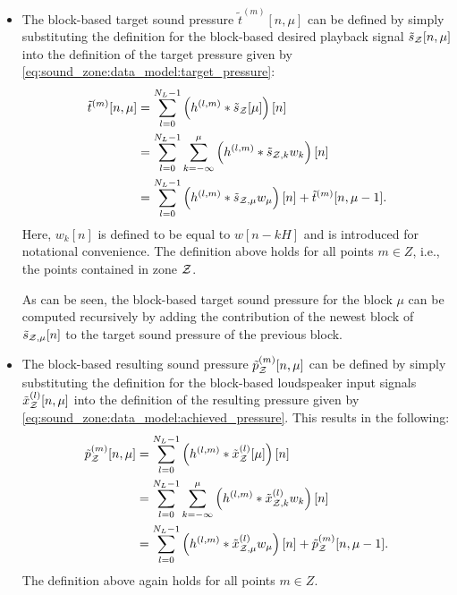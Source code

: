 \begin{itemize}
    \item 
        The block-based target sound pressure $\tilde{t}^{(m)}[n, \mu]$ can be defined by simply 
        substituting the definition for the block-based desired playback signal $\tilde{s}_{\mathcal{Z}}[n, \mu]$ into the definition of the 
        target pressure given by \autoref{eq:sound_zone:data_model:target_pressure}:
        \begin{equation}
            \begin{aligned}
                \tilde{t}^{(m)}[n, \mu] &= \sum_{l=0}^{N_L-1} \left(h^{(l,m)} \ast \tilde{s}_{\mathcal{Z}}[\mu]\right)[n]\\
                                        &= \sum_{l=0}^{N_L - 1}\sum_{k=-\infty}^{\mu}\left(h^{(l,m)}\ast\tilde{s}_{\mathcal{Z},k}w_k\right)[n] \\
                                   &= \sum_{l=0}^{N_L-1}\left(h^{(l,m)}\ast\tilde{s}_{\mathcal{Z},\mu}w_\mu\right)[n] + \tilde{t}^{(m)}[n, \mu - 1].  
            \end{aligned}
            \label{eq:perceptual_sound_zones:stft:block_based:target_pressure}
        \end{equation}
        Here, $w_k[n]$ is defined to be equal to $w[n - kH]$ and is introduced for notational convenience.  
        The definition above holds for all points $m\in Z$, i.e., the points contained in zone $\mathcal{Z}$.  

        As can be seen, the block-based target sound pressure for the block $\mu$ can be computed recursively by adding the contribution of the newest block of $\tilde{s}_{\mathcal{Z},\mu}[n]$ to the target sound pressure of the previous block.
    \item 
        The block-based resulting sound pressure $\tilde{p}_{\mathcal{Z}}^{(m)}[n, \mu]$ can be defined by simply substituting the definition for the block-based loudspeaker input signals $\tilde{x}_{\mathcal{Z}}^{(l)}[n, \mu]$ into the definition of the resulting pressure given by \autoref{eq:sound_zone:data_model:achieved_pressure}.
        This results in the following: 
        \begin{equation}
            \begin{aligned}
                \tilde{p}_{\mathcal{Z}}^{(m)}[n, \mu] &= \sum_{l=0}^{N_L-1}                       \left(h^{(l,m)} \ast \tilde{x}^{(l)}_{\mathcal{Z}}[\mu]\right)[n]\\
                                            &= \sum_{l=0}^{N_L-1}\sum_{k=-\infty}^{\mu} \left(h^{(l,m)} \ast \tilde{x}^{(l)}_{\mathcal{Z},k}w_k\right)[n] \\
                                            &= \sum_{l=0}^{N_L-1}                       \left(h^{(l,m)} \ast \tilde{x}^{(l)}_{\mathcal{Z},\mu}w_\mu\right)[n] +
                                                \tilde{p}_{\mathcal{Z}}^{(m)}[n, \mu - 1].
            \end{aligned}
            \label{eq:perceptual_sound_zones:stft:block_based:achieved_pressure}
        \end{equation}
        The definition above again holds for all points $m\in Z$.  


\end{itemize}

